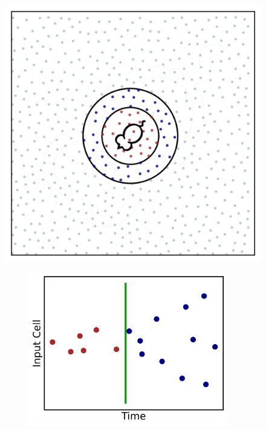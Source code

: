 \documentclass{article}
\begin{document}
    \begin{figure}[htbp]
        \centering
        
        \begin{minipage}[b]{0.61\textwidth}
            \centering
            \subcaption{}
            \includegraphics[width=\textwidth]{mouse_plot.png}
        \end{minipage}
        \begin{minipage}[b]{0.38\textwidth}
            \centering
            \begin{subfigure}{\textwidth}
                \subcaption{}
                \includegraphics[width=0.95\textwidth]{input_STDP_plot.png}
            \end{subfigure}
            

\end{minipage}
\end{figure}
\end{document}
